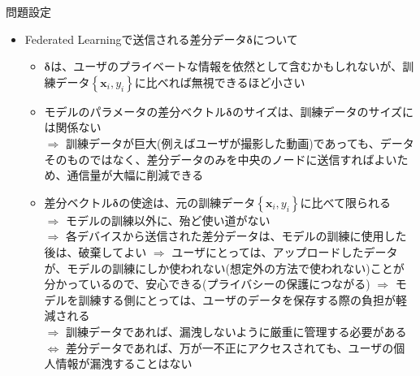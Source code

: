 \documentclass[dvipdfmx,notheorems,t]{beamer}
\begin{document}
\begin{frame}{問題設定}

\begin{itemize}
	\item Federated Learningで送信される差分データ$\bm{\delta}$について
	\begin{itemize}
		\item $\bm{\delta}$は、ユーザのプライベートな情報を依然として含むかもしれないが、訓練データ$\left\{ \bm{x}_i, y_i \right\}$に比べれば無視できるほど小さい
		\newline
		
		\item モデルのパラメータの差分ベクトル$\bm{\delta}$のサイズは、訓練データのサイズには関係ない \\
		$\Rightarrow$ 訓練データが巨大(例えばユーザが撮影した動画)であっても、データそのものではなく、差分データのみを中央のノードに送信すればよいため、\alert{通信量が大幅に削減}できる
		
		\framebreak
		
		\item 差分ベクトル$\bm{\delta}$の使途は、元の訓練データ$\left\{ \bm{x}_i, y_i \right\}$に比べて限られる \\
		$\Rightarrow$ モデルの訓練以外に、殆ど使い道がない \\
		$\Rightarrow$ 各デバイスから送信された差分データは、モデルの訓練に使用した後は、破棄してよい \newline \newline
		$\Rightarrow$ ユーザにとっては、アップロードしたデータが、モデルの訓練にしか使われない(想定外の方法で使われない)ことが分かっているので、安心できる(\alert{プライバシーの保護}につながる) \newline \newline
		$\Rightarrow$ モデルを訓練する側にとっては、ユーザのデータを保存する際の負担が軽減される \\
		$\Rightarrow$ 訓練データであれば、漏洩しないように厳重に管理する必要がある \\
		$\Leftrightarrow$ 差分データであれば、万が一不正にアクセスされても、ユーザの個人情報が漏洩することはない
	\end{itemize}
\end{itemize}

\end{frame}
\end{document}

